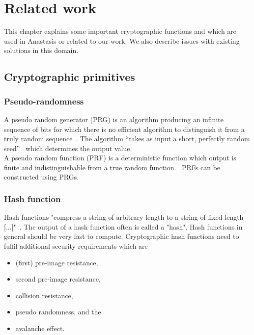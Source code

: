 \section{Related work}

This chapter explains some important cryptographic functions and which
are used in Anastasis or related to our work. We also describe issues
with existing solutions in this domain.

\subsection{Cryptographic primitives}

\subsubsection{Pseudo-randomness}

A pseudo random generator (PRG) is an algorithm producing an infinite
sequence of bits for which there is no efficient algorithm to
distinguish it from a truly random sequence~\cite{vadhan2012}. The
algorithm ``takes as input a short, perfectly random
seed''~\cite{vadhan2012} which determines the output value.\\

A pseudo random function (PRF) is a deterministic function which
output is finite and indistinguishable from a true random
function.~\cite{nielsen2002} PRFs can be constructed using
PRGs.~\cite{GGM1986}

\subsubsection{Hash function}

Hash functions "compress a string of arbitrary length to a string of
fixed length [...]"~\cite{Preneel1999}. The output of a hash function
often is called a "hash".  Hash functions in general should be very
fast to compute. Cryptographic hash functions need to fulfil
additional security requirements which are

\begin{itemize}
 \item (first) pre-image resistance,
 \item second pre-image resistance,
 \item collision resistance,
 \item pseudo randomness, and the
 \item avalanche effect.
\end{itemize}

